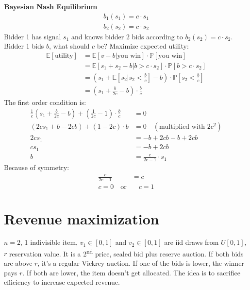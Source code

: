 \documentclass{article}
\begin{document}
\noindent
\textbf{Bayesian Nash Equilibrium}\\
\begin{equation*}
\begin{aligned}
    b_1(s_1)=c\cdot s_1\\
    b_2(s_2)=c\cdot s_2
\end{aligned}
\end{equation*}
Bidder 1 has signal $s_1$ and knows bidder 2 bids according to $b_2(s_2)=c\cdot s_2$. Bidder 1 bids $b$, what should $c$ be? Maximize expected utility:
\begin{equation*}
    \begin{aligned}
        \mathbb{E}[\text{utility}]&=\mathbb{E}[v-b|\text{you win}]\cdot\mathbb{P}[\text{you win}]\\
        &= \mathbb{E}[s_1+s_2-b|b>c\cdot s_2]\cdot\mathbb{P}[b>c\cdot s_2]\\
        &=\left(s_1 + \mathbb{E}\left[s_2|s_2<\frac{b}{c}\right]-b\right)\cdot\mathbb{P}\left[s_2<\frac{b}{c}\right]\\
        &=\left(s_1+\frac{b}{2c}-b\right)\cdot\frac{b}{c}
    \end{aligned}
\end{equation*}
The first order condition is:
\begin{equation*}
    \begin{aligned}
        \frac{1}{c}\left(s_1+\frac{b}{2c}-b\right) + \left(\frac{1}{2c}-1\right)\cdot\frac{b}{c}&=0\\
        (2cs_1+b-2cb)+(1-2c)\cdot b&=0 \quad(\text{multiplied with }2c^2)\\
        2cs_1&=-b+2cb-b+2cb\\
        cs_1&=-b+2cb\\
        b&=\frac{c}{2c-1}\cdot s_1
    \end{aligned}
\end{equation*}
Because of symmetry:
\begin{equation*}
    \begin{aligned}
        \frac{c}{2c-1}&=c\\
        c=0\quad\text{or}&\quad c=1
    \end{aligned}
\end{equation*}

\section{Revenue maximization}
$n=2$, 1 indivisible item, $v_1\in[0,1]$ and $v_2\in[0,1]$ are iid draws from $U[0,1]$, $r$ reservation value. It is a 2\textsuperscript{nd} price, sealed bid plus reserve auction. If both bids are above $r$, it's a regular Vickrey auction. If one of the bids is lower, the winner pays $r$. If both are lower, the item doesn't get allocated. The idea is to sacrifice efficiency to increase expected revenue.\\
\end{document}
